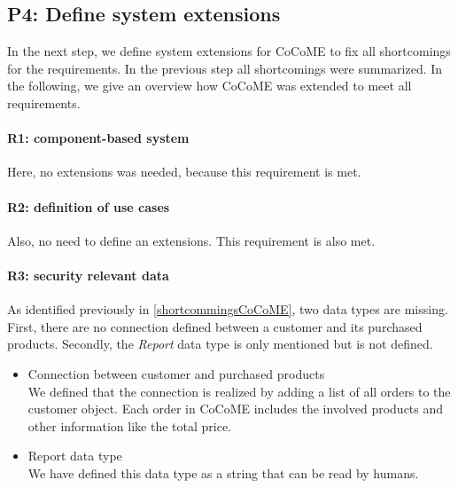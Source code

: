\subsection{P4: Define system extensions}
In the next step, we define system extensions for CoCoME to fix all shortcomings for the requirements. In the previous step all shortcomings were summarized. In the following, we give an overview how CoCoME was extended to meet all requirements.

\paragraph{R1: component-based system}
Here, no extensions was needed, because this requirement is met.
\paragraph{R2: definition of use cases}
Also, no need to define an extensions. This requirement is also met.
\paragraph{R3: security relevant data}
As identified previously in \autoref{shortcommingsCoCoME}, two data types are missing. First, there are no connection defined between a customer and its purchased products. Secondly, the \textit{Report} data type is only mentioned but is not defined.
\begin{itemize}
\item Connection between customer and purchased products\\ We defined that the connection is realized by adding a list of all orders to the customer object. Each order in CoCoME includes the involved products and other information like the total price. 
\item Report data type\\ We have defined this data type as a string that can be read by humans.
\end{itemize}
